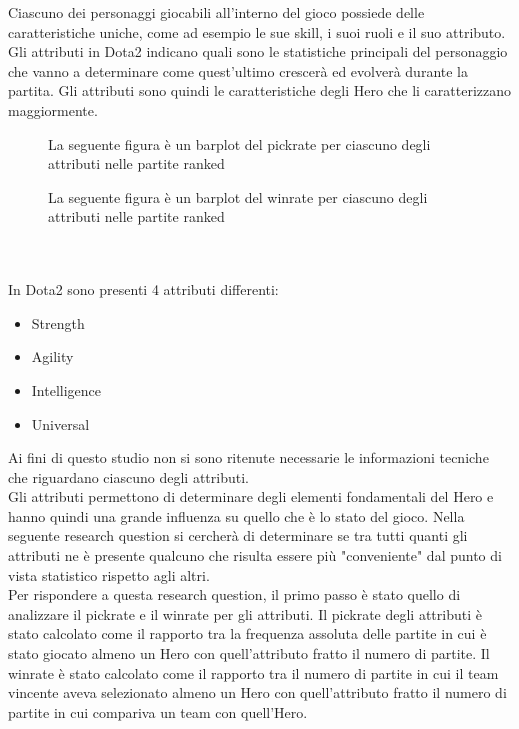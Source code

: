 Ciascuno dei personaggi giocabili all'interno del gioco possiede delle caratteristiche uniche, come ad esempio le sue skill, i suoi ruoli e il suo attributo. Gli attributi in Dota2 indicano quali sono le statistiche principali del personaggio che vanno a determinare come quest'ultimo crescerà ed evolverà durante la partita. Gli attributi sono quindi le caratteristiche degli Hero che li caratterizzano maggiormente. \\
\begin{figure}[htbp]
\centering
\begin{multicols}{2}
\hspace*{-0.2\linewidth}

\caption{La seguente figura è un barplot del pickrate per ciascuno degli attributi nelle partite ranked}
\label{pickrate_attributi_ranked}
\hspace*{-0.1\linewidth}

\caption{La seguente figura è un barplot del winrate per ciascuno degli attributi nelle partite ranked}
\label{winrate_attributi_ranked}
\end{multicols}
\end{figure} \\ \\
In Dota2 sono presenti 4 attributi differenti:
\begin{itemize}
\item Strength
\item Agility
\item Intelligence
\item Universal 
\end{itemize}
Ai fini di questo studio non si sono ritenute necessarie le informazioni tecniche che riguardano ciascuno degli attributi. \\
Gli attributi permettono di determinare degli elementi fondamentali del Hero e hanno quindi una grande influenza su quello che è lo stato del gioco. Nella seguente research question si cercherà di determinare se tra tutti quanti gli attributi ne è presente qualcuno che risulta essere più "conveniente" dal punto di vista statistico rispetto agli altri. \\
Per rispondere a questa research question, il primo passo è stato quello di analizzare il pickrate e il winrate per gli attributi. Il pickrate degli attributi è stato calcolato come il rapporto tra la frequenza assoluta delle partite in cui è stato giocato almeno un Hero con quell'attributo fratto il numero di partite. Il winrate è stato calcolato come il rapporto tra il numero di partite in cui il team vincente aveva selezionato almeno un Hero con quell'attributo fratto il numero di partite in cui compariva un team con quell'Hero. \\
